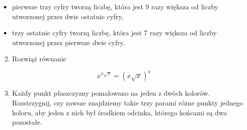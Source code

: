 \documentclass[10pt]{article}
\begin{document}
\begin{itemize}
  \item pierwsze trzy cyfry tworzą liczbę, która jest 9 razy większa od liczby utworzonej przez dwie ostatnie cyfry,
  \item trzy ostatnie cyfry tworzą liczbę, która jest 7 razy większa od liczby utworzonej przez pierwsze dwie cyfry.
\end{itemize}

\begin{enumerate}
  \setcounter{enumi}{1}
  \item Rozwiąż równanie
\end{enumerate}

\[
x^{x \sqrt{x}}=(x \sqrt{x})^{x}
\]

\begin{enumerate}
  \setcounter{enumi}{2}
  \item Każdy punkt płaszczyzny pomalowano na jeden z dwóch kolorów. Rozstrzygnij, czy zawsze znajdziemy takie trzy parami różne punkty jednego koloru, aby jeden z nich był środkiem odcinka, którego końcami są dwa pozostałe.
\end{enumerate}
\end{document}
